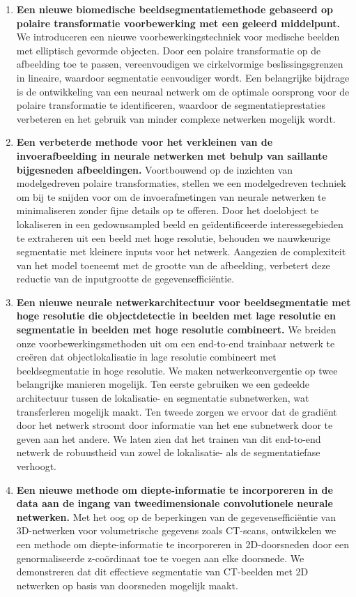 \begin{enumerate}
	\item \textbf{Een nieuwe biomedische beeldsegmentatiemethode gebaseerd op polaire transformatie voorbewerking met een geleerd middelpunt.} We introduceren een nieuwe voorbewerkingstechniek voor medische beelden met elliptisch gevormde objecten. Door een polaire transformatie op de afbeelding toe te passen, vereenvoudigen we cirkelvormige beslissingsgrenzen in lineaire, waardoor segmentatie eenvoudiger wordt. Een belangrijke bijdrage is de ontwikkeling van een neuraal netwerk om de optimale oorsprong voor de polaire transformatie te identificeren, waardoor de segmentatieprestaties verbeteren en het gebruik van minder complexe netwerken mogelijk wordt.
	\item \textbf{Een verbeterde methode voor het verkleinen van de invoerafbeelding in neurale netwerken met behulp van saillante bijgesneden afbeeldingen.} Voortbouwend op de inzichten van modelgedreven polaire transformaties, stellen we een modelgedreven techniek om bij te snijden voor om de invoerafmetingen van neurale netwerken te minimaliseren zonder fijne details op te offeren. Door het doelobject te lokaliseren in een gedownsampled beeld en geïdentificeerde interessegebieden te extraheren uit een beeld met hoge resolutie, behouden we nauwkeurige segmentatie met kleinere inputs voor het netwerk. Aangezien de complexiteit van het model toeneemt met de grootte van de afbeelding, verbetert deze reductie van de inputgrootte de gegevensefficiëntie.
	\item \textbf{Een nieuwe neurale netwerkarchitectuur voor beeldsegmentatie met hoge resolutie die objectdetectie in beelden met lage resolutie en segmentatie in beelden met hoge resolutie combineert.} We breiden onze voorbewerkingsmethoden uit om een end-to-end trainbaar netwerk te creëren dat objectlokalisatie in lage resolutie combineert met beeldsegmentatie in hoge resolutie. We maken netwerkconvergentie op twee belangrijke manieren mogelijk. Ten eerste gebruiken we een gedeelde architectuur tussen de lokalisatie- en segmentatie subnetwerken, wat transferleren mogelijk maakt. Ten tweede zorgen we ervoor dat de gradiënt door het netwerk stroomt door informatie van het ene subnetwerk door te geven aan het andere. We laten zien dat het trainen van dit end-to-end netwerk de robuustheid van zowel de lokalisatie- als de segmentatiefase verhoogt.
	\item \textbf{Een nieuwe methode om diepte-informatie te incorporeren in de data aan de ingang van tweedimensionale convolutionele neurale netwerken.} Met het oog op de beperkingen van de gegevensefficiëntie van 3D-netwerken voor volumetrische gegevens zoals CT-scans, ontwikkelen we een methode om diepte-informatie te incorporeren in 2D-doorsneden door een genormaliseerde z-coördinaat toe te voegen aan elke doorsnede. We demonstreren dat dit effectieve segmentatie van CT-beelden met 2D netwerken op basis van doorsneden mogelijk maakt.
\end{enumerate}

